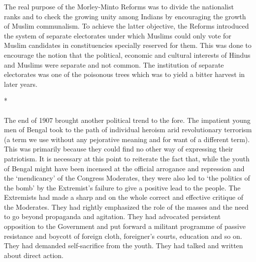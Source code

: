 The real purpose of the Morley-Minto Reforms was to divide the nationalist ranks and to check the growing unity among Indians by encouraging the growth of Muslim communalism. To achieve the latter objective, the Reforms introduced the system of separate electorates under which Muslims could only vote for Muslim candidates in constituencies specially reserved for them. This was done to encourage the notion that the political, economic and cultural interests of Hindus and Muslims were separate and not common. The institution of separate electorates was one of the poisonous trees which was to yield a bitter harvest in later years.

\begin{center}*\end{center}

\paragraph*{}

The end of 1907 brought another political trend to the fore. The impatient young men of Bengal took to the path of individual heroism arid revolutionary terrorism (a term we use without any pejorative meaning and for want of a different term). This was primarily because they could find no other way of expressing their patriotism. It is necessary at this point to reiterate the fact that, while the youth of Bengal might have been incensed at the official arrogance and repression and the `mendicancy' of the Congress Moderates, they were also led to `the politics of the bomb' by the Extremist's failure to give a positive lead to the people. The Extremists had made a sharp and on the whole correct and effective critique of the Moderates. They had rightly emphasized the role of the masses and the need to go beyond propaganda and agitation. They had advocated persistent opposition to the Government and put forward a militant programme of passive resistance and boycott of foreign cloth, foreigner's courts, education and so on. They had demanded self-sacrifice from the youth. They had talked and written about direct action.

